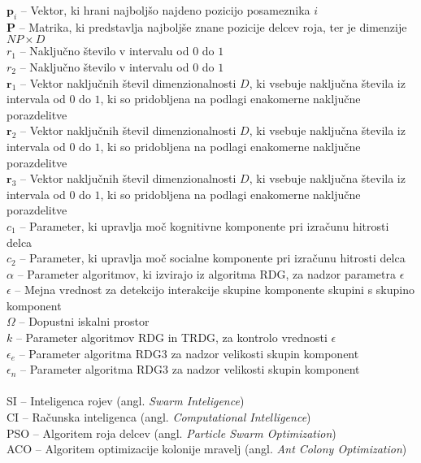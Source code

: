 $\mathbf{p}_i$ -- Vektor, ki hrani najboljšo najdeno pozicijo posameznika $i$ \\
$\mathbf{P}$ -- Matrika, ki predstavlja najboljše znane pozicije delcev roja, ter je dimenzije $\mathit{NP} \times \mathit{D}$ \\
$r_1$ -- Naključno število v intervalu od $0$ do $1$ \\
$r_2$ -- Naključno število v intervalu od $0$ do $1$ \\
$\mathbf{r}_1$ -- Vektor naključnih števil dimenzionalnosti $\mathit{D}$, ki vsebuje naključna števila iz intervala od $0$ do $1$, ki so pridobljena na podlagi enakomerne naključne porazdelitve \\
$\mathbf{r}_2$ -- Vektor naključnih števil dimenzionalnosti $\mathit{D}$, ki vsebuje naključna števila iz intervala od $0$ do $1$, ki so pridobljena na podlagi enakomerne naključne porazdelitve \\
$\mathbf{r}_3$ -- Vektor naključnih števil dimenzionalnosti $\mathit{D}$, ki vsebuje naključna števila iz intervala od $0$ do $1$, ki so pridobljena na podlagi enakomerne naključne porazdelitve \\
$c_1$ -- Parameter, ki upravlja moč kognitivne komponente pri izračunu hitrosti delca \\
$c_2$ -- Parameter, ki upravlja moč socialne komponente pri izračunu hitrosti delca \\
$\alpha$ -- Parameter algoritmov, ki izvirajo iz algoritma RDG, za nadzor parametra $\epsilon$  \\
$\epsilon$ -- Mejna vrednost za detekcijo interakcije skupine komponente skupini s skupino komponent \\
$\Omega$ -- Dopustni iskalni prostor \\
$k$ -- Parameter algoritmov RDG in TRDG, za kontrolo vrednosti $\epsilon$ \\
$\epsilon_e$ -- Parameter algoritma RDG3 za nadzor velikosti skupin komponent \\
$\epsilon_n$ -- Parameter algoritma RDG3 za nadzor velikosti skupin komponent \\
\\
SI -- Inteligenca rojev (angl. \textit{Swarm Inteligence}) \\
CI -- Računska inteligenca (angl. \textit{Computational Intelligence}) \\
PSO -- Algoritem roja delcev (angl. \textit{Particle Swarm Optimization}) \\
ACO -- Algoritem optimizacije kolonije mravelj (angl. \textit{Ant Colony Optimization}) \\
